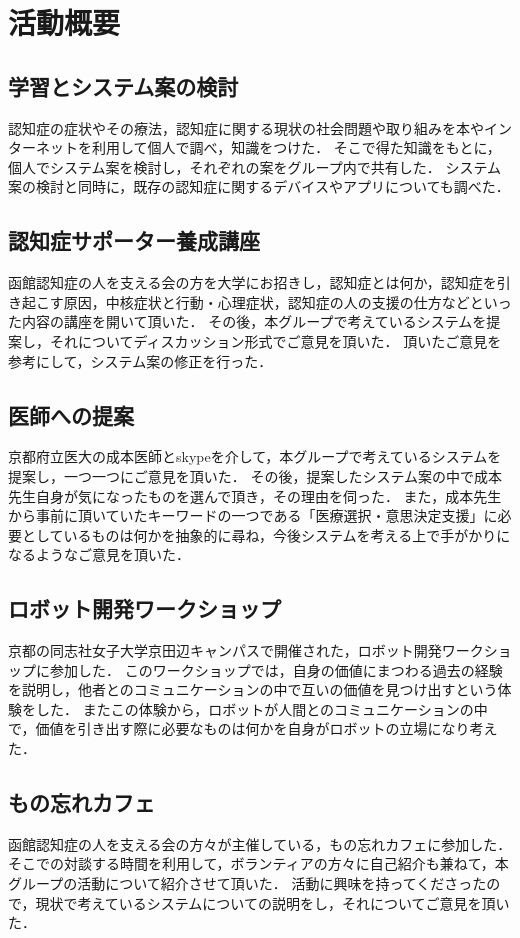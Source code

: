 \documentclass[../report]{subfiles}
\begin{document}
\section{活動概要}
\subsection{学習とシステム案の検討}\label{sec:kentou}
認知症の症状やその療法，認知症に関する現状の社会問題や取り組みを本やインターネットを利用して個人で調べ，知識をつけた．
そこで得た知識をもとに，個人でシステム案を検討し，それぞれの案をグループ内で共有した．
システム案の検討と同時に，既存の認知症に関するデバイスやアプリについても調べた．

\subsection{認知症サポーター養成講座}
函館認知症の人を支える会の方を大学にお招きし，認知症とは何か，認知症を引き起こす原因，中核症状と行動・心理症状，認知症の人の支援の仕方などといった内容の講座を開いて頂いた．
その後，本グループで考えているシステムを提案し，それについてディスカッション形式でご意見を頂いた．
頂いたご意見を参考にして，システム案の修正を行った．

\subsection{医師への提案}
京都府立医大の成本医師とskypeを介して，本グループで考えているシステムを提案し，一つ一つにご意見を頂いた．
その後，提案したシステム案の中で成本先生自身が気になったものを選んで頂き，その理由を伺った．
また，成本先生から事前に頂いていたキーワードの一つである「医療選択・意思決定支援」に必要としているものは何かを抽象的に尋ね，今後システムを考える上で手がかりになるようなご意見を頂いた．

\subsection{ロボット開発ワークショップ}
京都の同志社女子大学京田辺キャンパスで開催された，ロボット開発ワークショップに参加した．
このワークショップでは，自身の価値にまつわる過去の経験を説明し，他者とのコミュニケーションの中で互いの価値を見つけ出すという体験をした．
またこの体験から，ロボットが人間とのコミュニケーションの中で，価値を引き出す際に必要なものは何かを自身がロボットの立場になり考えた．

\subsection{もの忘れカフェ}
函館認知症の人を支える会の方々が主催している，もの忘れカフェに参加した．
そこでの対談する時間を利用して，ボランティアの方々に自己紹介も兼ねて，本グループの活動について紹介させて頂いた．
活動に興味を持ってくださったので，現状で考えているシステムについての説明をし，それについてご意見を頂いた．
\end{document}
